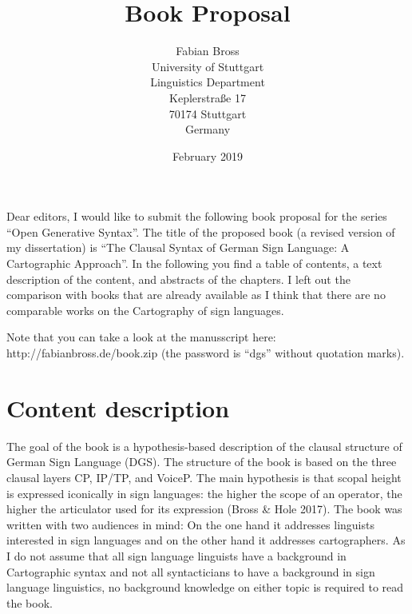 \documentclass[a4paper,DIV=calc,11pt]{scrartcl}
\begin{document}
	
	
\title{Book Proposal}
\author{Fabian Bross \\ University of Stuttgart \\ Linguistics Department \\ Keplerstraße 17 \\ 70174 Stuttgart \\ Germany}
\date{\small February 2019}
\maketitle %

\noindent Dear editors, I would like to submit the following book proposal for the series ``Open Generative Syntax''. The title of the proposed book (a revised version of my dissertation) is ``The Clausal Syntax of German Sign Language: A Cartographic Approach''. In the following you find a table of contents, a text description of the content, and abstracts of the chapters. I left out the comparison with books that are already available as I think that there are no comparable works on the Cartography of sign languages.

Note that you can take a look at the manusscript here: http://fabianbross.de/book.zip (the password is ``dgs'' without quotation marks). 





\section*{Content description}
\noindent The goal of the book is a hypothesis-based description of the clausal structure of German Sign Language (DGS). The structure of the book is based on the three clausal layers CP, IP/TP, and VoiceP. The main hypothesis is that scopal height is expressed iconically in sign languages: the higher the scope of an operator, the higher the articulator used for its expression (Bross \& Hole 2017). The book was written with two audiences in mind: On the one hand it addresses linguists interested in sign languages and on the other hand it addresses cartographers. As I do not assume that all sign language linguists have a background in Cartographic syntax and not all syntacticians to have a background in sign language linguistics, no background knowledge on either topic is required to read the book.
\end{document}
